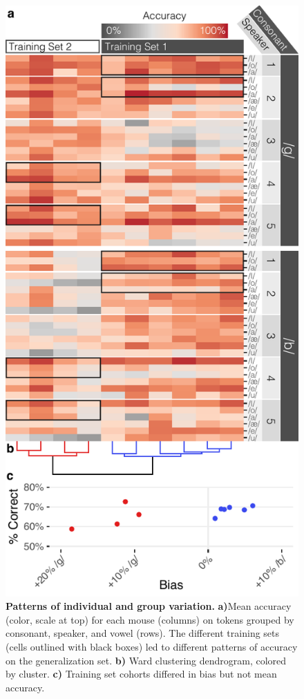 \documentclass[preprint, NumberedRefs]{JASAnew}\usepackage[]{graphicx}\usepackage[]{color}
\begin{document}
\begin{figure}[ht]
\includegraphics[width=\reprintcolumnwidth]{../figures/Figure4.pdf}
\caption{\label{heat}{\textbf{Patterns of individual and group variation.} \textbf{a)}Mean accuracy (color, scale at top) for each mouse (columns) on tokens grouped by consonant, speaker, and vowel (rows). The different training sets (cells outlined with black boxes) led to different patterns of accuracy on the generalization set. \textbf{b)} Ward clustering dendrogram, colored by cluster. \textbf{c)} Training set cohorts differed in bias but not mean accuracy.
}}
\end{figure}
\end{document}
